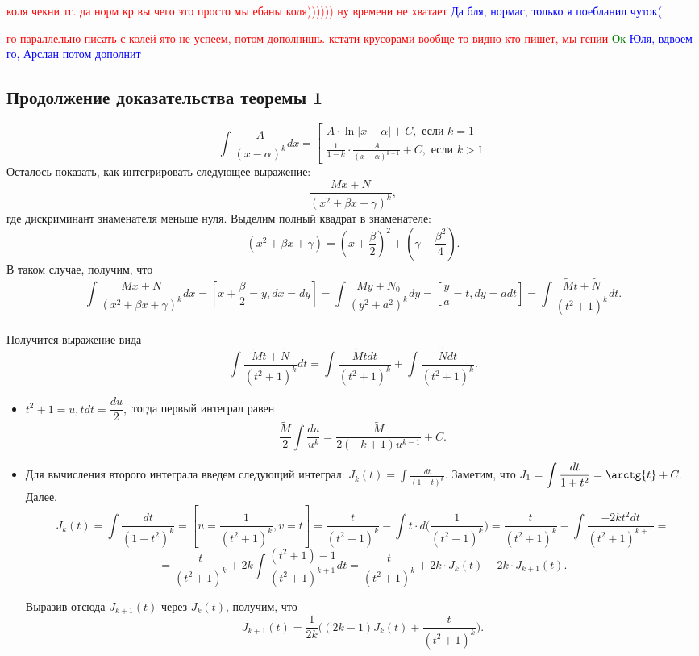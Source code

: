 \documentclass{article}
\theoremstyle{plain}
\theoremstyle{definition}
\theoremstyle{remark}
\renewcommand{\*}{\cdot}
\begin{document}
\textcolor{red}{коля чекни тг. да норм кр вы чего это просто мы ебаны коля)))))) ну времени не хватает}
\textcolor{blue}{Да бля, нормас, только я поебланил чуток(}



\textcolor{red}{го параллельно писать с колей
ято не успеем, потом дополнишь. кстати крусорами вообще-то видно кто пишет, мы гении}
\textcolor{green}{Ок}
\textcolor{blue}{Юля, вдвоем го, Арслан потом дополнит}



\subsection{Продолжение доказательства теоремы 1}
$$\int \frac{A}{(x-\alpha)^{k}}dx = 
\left[
\begin{aligned}
A\cdot \ln{|x-\alpha|} + C, \text{ если } k = 1\\
\frac{1}{1-k}\cdot \frac{A}{(x-\alpha)^{k-1}} + C, \text{ если } k > 1
\end{aligned}
\right.
$$
Осталось показать, как интегрировать следующее выражение:
 \[
\frac{Mx + N}{(x^2 + \beta x + \gamma)^k},\] где дискриминант знаменателя меньше нуля. Выделим полный квадрат в знаменателе: \[(x^2 + \beta x + \gamma) = \left(x + \frac{\beta}{2}\right)^2 + \left(\gamma - \frac{\beta^2}{4}\right).\] В таком случае, получим, что \[\int \frac{Mx + N}{(x^2 + \beta x + \gamma)^k}dx = [x + \frac{\beta}{2} = y, dx = dy] = \int \frac{My + N_0}{(y^2 + a^2)^k}dy = [\frac{y}{a} = t, dy = adt] = \int \frac{\widetilde{M}t + \widetilde{N}}{(t^2 + 1)^k}dt.\] \\
Получится выражение вида \[\int \frac{\widetilde{M}t + \widetilde{N}}{(t^2 + 1)^k}dt = \int \frac{\widetilde{M}tdt}{(t^2 + 1)^k} + \int \frac{\widetilde{N}dt}{(t^2 + 1)^k}.\]
\begin{itemize}
    \item $t^2 + 1 = u, tdt = \dfrac{du}{2},$ тогда первый интеграл равен $$\frac{\widetilde{M}}{2}\int \frac{du}{u^k} = \frac{\widetilde{M}}{2(-k+1)u^{k-1}} + C.$$
    \item Для вычисления второго интеграла введем следующий интеграл: $\displaystyle J_k(t) = \int \frac{dt}{(1+t)^k}.$ Заметим, что $\displaystyle J_1 = \int \frac{dt}{1 + t^2} = \arctg{t} + C.$ Далее, \[J_k(t) = \int \frac{dt}{(1 + t^2)^k} = [u = \frac{1}{(t^2 + 1)^k}, v = t] = \frac{t}{(t^2 + 1)^k} - \int t \cdot d\Big(\frac{1}{(t^2 + 1)^k}\Big) = \frac{t}{(t^2 + 1)^k} - \int \frac{-2kt^2dt}{(t^2 + 1)^{k+1}} =\]\[= \frac{t}{(t^2 + 1)^k} + 2k \int \frac{(t^2 + 1) - 1}{(t^2 + 1)^{k+1}}dt = \frac{t}{(t^2 + 1)^k} + 2k \cdot J_k(t) - 2k \cdot J_{k+1}(t).\]
    
    Выразив отсюда $J_{k+1}(t)$ через $J_{k}(t)$, получим, что \[J_{k+1}(t) = \frac{1}{2k}\Big((2k - 1)J_k(t) + \frac{t}{(t^2 + 1)^k}\Big).\] 
\end{itemize}
\end{document}
